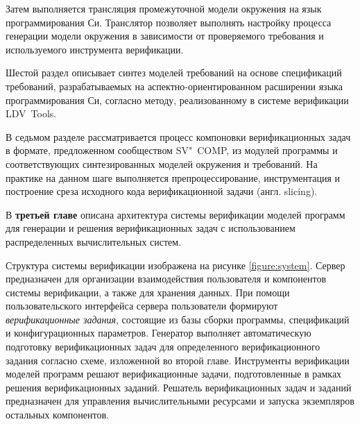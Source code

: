 \documentclass[%
autoref,
colorlinks,  
facsimile,   %
]{disser}
\begin{document}
Затем выполняется трансляция промежуточной модели окружения на язык программирования Си.
Транслятор позволяет выполнять настройку процесса генерации модели окружения в зависимости от проверяемого требования и используемого инструмента верификации.

Шестой раздел описывает синтез моделей требований на основе спецификаций требований, разрабатываемых на аспектно-ориентированном расширении языка программирования Си, согласно методу, реализованному в системе верификации LDV~Tools.

В седьмом разделе рассматривается процесс компоновки верификационных задач в формате, предложенном сообществом SV"~COMP, из модулей программы и соответствующих синтезированных моделей окружения и требований. 
На практике на данном шаге выполняется препроцессирование, инструментация и построение среза исходного кода верификационной задачи (англ. slicing).

В \textbf{третьей главе} описана архитектура системы верификации моделей программ для генерации и решения верификационных задач с использованием распределенных вычислительных систем.

Структура системы верификации изображена на рисунке \ref{figure:system}. 
Сервер предназначен для организации взаимодействия пользователя и компонентов системы верификации, а также для хранения данных.
При помощи пользовательского интерфейса сервера пользователи формируют \textit{верификационные задания}, состоящие из базы сборки программы, спецификаций и конфигурационных параметров.
Генератор выполняет автоматическую подготовку верификационных задач для определенного верификационного задания согласно схеме, изложенной во второй главе. 
Инструменты верификации моделей программ решают верификационные задачи, подготовленные в рамках решения верификационных заданий.
Решатель верификационных задач и заданий предназначен для управления вычислительными ресурсами и запуска экземпляров остальных компонентов.
\end{document}
